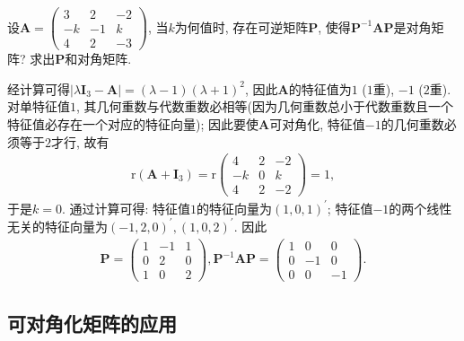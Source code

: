 \documentclass[../../main.tex]{subfiles}%
\begin{document}
\begin{example}
设\(\boldsymbol{A}=\begin{pmatrix}
3&2&-2\\
-k&-1&k\\
4&2&-3
\end{pmatrix}\), 当\(k\)为何值时, 存在可逆矩阵\(\boldsymbol{P}\), 使得\(\boldsymbol{P}^{-1}\boldsymbol{AP}\)是对角矩阵? 求出\(\boldsymbol{P}\)和对角矩阵.
\end{example}
\begin{solution}
经计算可得\(\vert\lambda\boldsymbol{I}_{3}-\boldsymbol{A}\vert = (\lambda - 1)(\lambda + 1)^{2}\), 因此\(\boldsymbol{A}\)的特征值为\(1\) (\(1\)重), \(-1\) (\(2\)重). 对单特征值\(1\), 其几何重数与代数重数必相等(因为几何重数总小于代数重数且一个特征值必存在一个对应的特征向量); 因此要使\(\boldsymbol{A}\)可对角化, 特征值\(-1\)的几何重数必须等于\(2\)才行, 故有
\begin{align*}
\mathrm{r}(\boldsymbol{A}+\boldsymbol{I}_{3})=\mathrm{r}\begin{pmatrix}
4&2&-2\\
-k&0&k\\
4&2&-2
\end{pmatrix}=1,
\end{align*}
于是\(k = 0\). 通过计算可得: 特征值\(1\)的特征向量为\((1,0,1)^{\prime}\); 特征值\(-1\)的两个线性无关的特征向量为\((-1,2,0)^{\prime},(1,0,2)^{\prime}\). 因此
\begin{align*}
\boldsymbol{P}=\begin{pmatrix}
1&-1&1\\
0&2&0\\
1&0&2
\end{pmatrix}, \boldsymbol{P}^{-1}\boldsymbol{AP}=\begin{pmatrix}
1&0&0\\
0&-1&0\\
0&0&-1
\end{pmatrix}. 
\end{align*} 

\end{solution}

\subsection{可对角化矩阵的应用}
\end{document}
